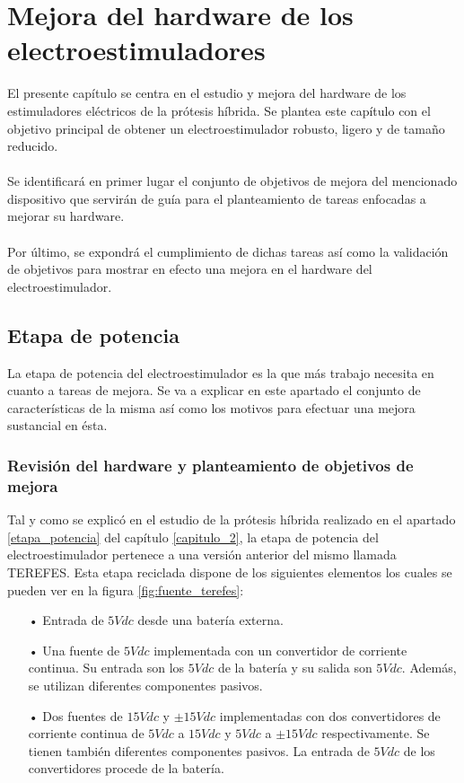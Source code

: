 \chapter{Mejora del hardware de los electroestimuladores}
El presente capítulo se centra en el estudio y mejora del hardware de los estimuladores eléctricos de la prótesis híbrida. Se plantea este capítulo con el objetivo principal de obtener un electroestimulador robusto, ligero y de tamaño reducido.
\\
\\
Se identificará en primer lugar el conjunto de objetivos de mejora del mencionado dispositivo que servirán de guía para el planteamiento de tareas enfocadas a mejorar su hardware. 
\\
\\
Por último, se expondrá el cumplimiento de dichas tareas así como la validación de objetivos para mostrar en efecto una mejora en el hardware del electroestimulador.

\section{Etapa de potencia}\label{mejora_hardware_potencia}
La etapa de potencia del electroestimulador es la que más trabajo necesita en cuanto a tareas de mejora. Se va a explicar en este apartado el conjunto de características de la misma así como los motivos para efectuar una mejora sustancial en ésta. 

\subsection{Revisión del hardware y planteamiento de objetivos de mejora}
Tal y como se explicó en el estudio de la prótesis híbrida realizado en el apartado \ref{etapa_potencia} del capítulo \ref{capitulo_2}, la etapa de potencia del electroestimulador pertenece a una versión anterior del mismo llamada TEREFES. Esta etapa reciclada dispone de los siguientes elementos los cuales se pueden ver en la figura \ref{fig:fuente_terefes}:

\begin{itemize}
\item[•] Entrada de $5Vdc$ desde una batería externa.
\item[•] Una fuente de $5Vdc$ implementada con un convertidor de corriente continua. Su entrada son los $5Vdc$ de la batería y su salida son $5Vdc$. Además, se utilizan diferentes componentes pasivos.
\item[•] Dos fuentes de $15Vdc$ y $\pm15Vdc$ implementadas con dos convertidores de corriente continua de $5Vdc$ a $15Vdc$ y $5Vdc$ a $\pm15Vdc$ respectivamente. Se tienen también diferentes componentes pasivos. La entrada de $5Vdc$ de los convertidores procede de la batería.
\end{itemize}

